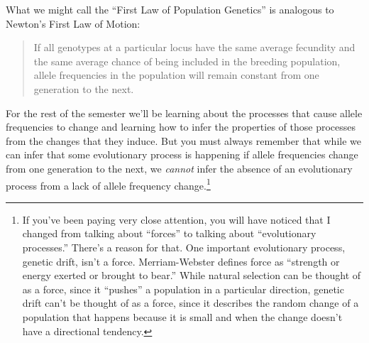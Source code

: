 What we might call the ``First Law of Population Genetics'' is
analogous to Newton's First Law of Motion:
\begin{quotation}
\noindent If all genotypes at a particular locus have the same average
fecundity and the same average chance of being included in the breeding
population, allele frequencies in the population will remain constant
from one generation to the next.
\end{quotation}
For the rest of the semester we'll be learning about the processes
that cause allele frequencies to change and learning how to infer the
properties of those processes from the changes that they induce. But
you must always remember that while we can infer that some
evolutionary process is happening if allele frequencies change from
one generation to the next, we {\it cannot\/} infer the absence of an
evolutionary process from a lack of allele frequency
change.\footnote{If you've been paying very close attention, you will
  have noticed that I changed from talking about ``forces'' to talking
about ``evolutionary processes.'' There's a reason for that. One
important evolutionary process, genetic drift, isn't a
force. Merriam-Webster defines force as ``strength or energy exerted
or brought to bear.'' While natural selection can be thought of as a
force, since it ``pushes'' a population in a particular direction,
genetic drift can't be thought of as a force, since it describes the
random change of a population that happens because it is small and
when the change doesn't have a directional tendency.}

